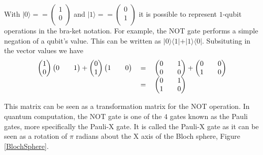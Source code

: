 \documentclass[authoryearcitations]{UoYCSproject}
\begin{document}
With
$\vert
0
\rangle
== 
\begin {pmatrix}
1\\
0\\
\end{pmatrix}
$
and
$\vert
1
\rangle
==  
\begin {pmatrix}
0\\
1\\
\end{pmatrix}
$
it is possible to represent $1$-qubit operations in the bra-ket notation.
For example, the NOT gate performs a simple negation of a qubit's value.
This can be written as $\vert0\rangle\langle1\vert + \vert1\rangle\langle0\vert$.
Subsituting in the vector values we have
\begin{equation}
\begin{tabular}{ r c l }
\(\begin {pmatrix}
1\\
0
\end{pmatrix}
\begin {pmatrix}
0&&
1
\end{pmatrix}
 + 
\begin {pmatrix}
0\\
1
\end{pmatrix}
\begin {pmatrix}
1&&
0
\end{pmatrix}\)
& \(=\)
& \( 
\begin{pmatrix}
0 && 1 \\
0 && 0
\end{pmatrix}
 + 
\begin{pmatrix}
0 && 0\\
1 && 0
\end{pmatrix}
\) \\
& \(=\)
& \( 
\begin{pmatrix}
0 && 1 \\
1 && 0
\end{pmatrix}
\)
\end{tabular}
\end{equation}

This matrix can be seen as a transformation matrix for the NOT operation.
In quantum computation, the NOT gate is one of the $4$ gates known as the Pauli gates, more specifically the Pauli-X gate.
It is called the Pauli-X gate as it can be seen as a rotation of $\pi$ radians about the X axis of the Bloch sphere, Figure \ref{BlochSphere}.
\end{document}
